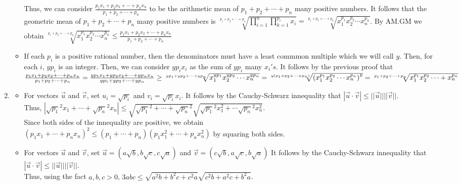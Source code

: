 \documentclass[10pt]{article}
\begin{document}
\begin{enumerate}[label= (Q-\arabic*)]
\begin{itemize}
        Thus, we can consider $\frac{p_1x_1+p_2x_2+\cdots+p_nx_n}{p_1+p_2+\cdots+p_n}$ to be the arithmetic mean of $p_1+p_2+\cdots+p_n$ many positive numbers.
        It follows that the geometric mean of $p_1+p_2+\cdots+p_n$ many positive numbers is $\displaystyle \sqrt[p_1+p_2+\cdots+p_n]{\prod_{i=1}^{n}\prod_{k=1}^{p_i}x_i}=\sqrt[p_1+p_2+\cdots+p_n]{x_1^{p_1}x_2^{p_2}\cdots x_n^{p_n}}$.
        By AM.GM we obtain $\sqrt[p_1+p_2+\cdots+p_n]{x_1^{p_1}x_2^{p_2}\cdots x_n^{p_n}}\le\frac{p_1x_1+p_2x_2+\cdots+p_nx_n}{p_1+p_2+\cdots+p_n}$
        \item If each $p_i$ is a positive rational number, then the denominators must have a least commmon multiple which we will call $y$. 
        Then, for each $i$, $yp_i$ is an integer. Then, we can consider $yp_i x_i$ as the sum of $yp_i$ many $x_i's$.
         It follows by the previous proof that\\ 
        $\frac{p_1x_1+p_2x_2+\cdots+p_nx_n}{p_1+p_2+\cdots+p_n}=\frac{yp_1x_1+yp_2x_2+\cdots+yp_nx_n}{yp_1+yp_2+\cdots+yp_n}\\
        \ge\sqrt[yp_1+yp_2+\cdots+yp_n]{x_1^{yp_1}x_2^{yp_2}\cdots x_n^{yp_n}}\\
        =\sqrt[y(p_1+p_2+\cdots+p_n)]{{(x_1^{p_1}x_2^{p_2}\cdots x_n^{p_n})}^y}=\sqrt[p_1+p_2+\cdots+p_n]{x_1^{p_1}x_2^{p_2}\cdots +x_n^{p_n}}$
    \end{itemize}
    \item \begin{itemize}
        \item For vectors $\vec{u}$ and $\vec{v}$, set $u_i=\sqrt{p_i}$ and $v_i=\sqrt{p_i}x_i$. 
        It follows by the Cauchy-Schwarz innequality that $|\vec{u}\cdot\vec{v}|\le||\vec{u}||||\vec{v}||$.\\
        Thus, $|\sqrt{p_1}^2x_1+\cdots+\sqrt{p_n}^2x_n|\le\sqrt{\sqrt{p_1}^2+\cdots+\sqrt{p_n}^2}\sqrt{\sqrt{p_1}^2x_1^2+\cdots\sqrt{p_n}^2x_n^2}$.\\ 
        Since both sides of the innequality are positive, we obtain\\ ${(p_1 x_1+\cdots +p_n x_n)}^2\le(p_1+\cdots +p_n)(p_1 x_1^2+\cdots +p_n x_n^2)$ by squaring both sides.
        \item For vectors $\vec{u}$ and $\vec{v}$, set $\vec{u}=(a\sqrt{b},b\sqrt{c},c\sqrt{a})$ and $\vec{v}=(c\sqrt{b},a\sqrt{c},b\sqrt{a})$
        It follows by the Cauchy-Schwarz innequality that $|\vec{u}\cdot\vec{v}|\le||\vec{u}||||\vec{v}||$.\\
        Thus, using the fact $a,b,c>0$, $3abc\le\sqrt{a^2 b+b^2 c+c^2 a}\sqrt{c^2 b+a^2 c+b^2 a}$.\\

\end{itemize}
\end{enumerate}
\end{document}
